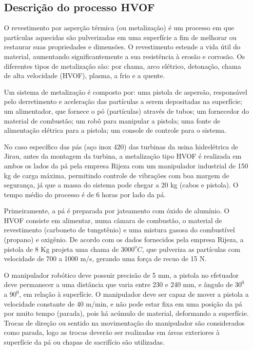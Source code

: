 \subsection{Descrição do processo HVOF}
\label{desc_hvof}
O revestimento por asperção térmica (ou metalização) é um processo em que
partículas aquecidas são pulverizadas em uma superfície a fim de melhorar ou
restaurar suas propriedades e dimensões. O revestimento estende a vida útil do
material, aumentando significantemente a sua resistência à erosão e corrosão.
Os diferentes tipos de metalização são: por chama, arco elétrico, detonação,
chama de alta velocidade (HVOF), plasma, a frio e a quente.

Um sistema de metalização é composto por: uma pistola de aspersão, responsável
pelo derretimento e aceleração das partículas a serem depositadas na
superfície; um alimentador, que fornece o pó (partículas) através de tubos;
um fornecedor do material de combustão; um robô para manipular a pistola; uma
fonte de alimentação elétrica para a pistola; um console de controle para o
sistema.

No caso específico das pás (aço inox 420) das turbinas da usina hidrelétrica de
Jirau, antes da montagem da turbina, a metalização tipo HVOF é realizada em
ambos os lados da pá pela empresa Rijeza com um manipulador industrial de 150 kg
de carga máxima, permitindo controle de vibrações com boa margem de segurança, já que a massa do
sistema pode chegar a 20 kg (cabos e pistola). O tempo
médio do processo é de 6 horas por lado da pá.

Primeiramente, a pá é preparada por jateamento com óxido de alumínio. O HVOF
consiste em alimentar, numa câmara de combustão, o material de revestimento
(carboneto de tungstênio) e uma mistura gasosa do combustível (propano) e
oxigênio. De acordo com os dados fornecidos pela empresa Rijeza, a pistola de 8
Kg projeta uma chama de $3000^oC$, que pulveriza as partículas com velocidade de
700 a 1000 m/s, gerando uma força de recuo de 15 N.

O manipulador robótico deve possuir precisão de 5 mm, a pistola no
efetuador deve permanecer a uma distância que varia entre 230 e 240 mm, e ângulo
de $30^0$ a $90^0$, em relação à superfície. O manipulador deve ser capaz
de mover a pistola a velocidade constante de 40 m/min, e não pode estar
fixa em uma posição da pá por muito tempo (parada), pois há acúmulo de
material, deformando a superfície. Trocas de direção ou sentido na movimentação
do manipulador são considerados como parada, logo as trocas deverão ser
realizadas em áreas exteriores à superfície da pá ou chapas de sacrifício são
utilizadas. %
 
